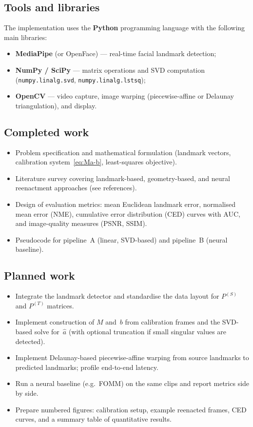 \documentclass[11pt,a4paper]{article}
\begin{document}
\subsection{Tools and libraries}

The implementation uses the \textbf{Python} programming language with the following
main libraries:
\begin{itemize}
  \item \textbf{MediaPipe} (or OpenFace) --- real-time facial landmark detection;
  \item \textbf{NumPy / SciPy} --- matrix operations and SVD computation
        (\texttt{numpy.linalg.svd}, \texttt{numpy.linalg.lstsq});
  \item \textbf{OpenCV} --- video capture, image warping (piecewise-affine or
        Delaunay triangulation), and display.
\end{itemize}

\subsection{Completed work}
\begin{itemize}
  \item Problem specification and mathematical formulation (landmark vectors,
        calibration system~\eqref{eq:Ma-b}, least-squares objective).
  \item Literature survey covering landmark-based, geometry-based, and neural
        reenactment approaches (see references).
  \item Design of evaluation metrics: mean Euclidean landmark error, normalised
        mean error (NME), cumulative error distribution (CED) curves with AUC,
        and image-quality measures (PSNR, SSIM).
  \item Pseudocode for pipeline~A (linear, SVD-based) and pipeline~B (neural
        baseline).
\end{itemize}

\subsection{Planned work}
\begin{itemize}
  \item Integrate the landmark detector and standardise the data layout for
        $P^{(S)}$ and $P^{(T)}$ matrices.
  \item Implement construction of $M$ and~$b$ from calibration frames and the
        SVD-based solve for~$\hat{a}$ (with optional truncation if small singular
        values are detected).
  \item Implement Delaunay-based piecewise-affine warping from source landmarks to
        predicted landmarks; profile end-to-end latency.
  \item Run a neural baseline (e.g.\ FOMM) on the same clips and report metrics
        side by side.
  \item Prepare numbered figures: calibration setup, example reenacted frames, CED
        curves, and a summary table of quantitative results.
\end{itemize}
\end{document}
